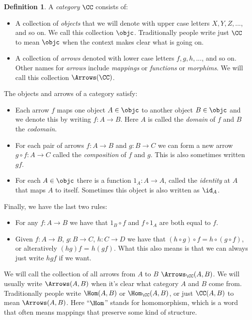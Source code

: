 \documentclass[12pt]{article}
\theoremstyle{definition}
\theoremstyle{definition}
\newtheorem{defn}{Definition}[]
\theoremstyle{definition}
\numberwithin{equation}{section}
\begin{document}
\begin{defn}
\label{category}
A {\it category} $\CC$ consists of:
% 
\begin{itemize}
\item 
A collection of {\it objects} that we will denote with upper case letters $X, Y, Z, ...$, and so on.  
We call this collection $\objc$. Traditionally people write just $\CC$ to mean $\objc$ when the context makes clear what is going on.
\item
A collection of {\it arrows} denoted with lower case letters $f, g, h, ...$, and so on. Other names for {\it arrows} include {\it mappings} or {\it functions} or {\it morphims}. We will call this collection $\Arrows(\CC)$.
\end{itemize}%
The objects and arrows of a category satisfy:
\begin{itemize}
\item
Each arrow $f$ maps one object $A \in \objc$ to another object $B \in \objc$ and we denote this by writing $f: A \to B$. Here $A$ is called the {\it domain} of $f$ and $B$ the {\it codomain}.

\item
For each pair of arrows $f:A \to B$ and $g : B \to C$ we can form a new arrow $g \circ f: A \to C$ called the {\it composition} of $f$ and $g$. This is also sometimes written $gf$.
\item
For each $A \in \objc$ there is a function $1_A: A \to A$, called the {\it identity} at $A$ that
maps $A$ to itself. Sometimes this object is also written as $\id_A$.
\end{itemize}
Finally, we have the last two rules:

\begin{itemize}
\item For any $f: A \to B$ we have that $1_B \circ f$ and $f \circ 1_A$ are both equal to $f$. 
\item Given $f: A \to B$, $g: B \to C$, $h: C\to D$ we have that $(h \circ g) \circ f = h \circ (g \circ f)$, or alteratively $(hg)f$ = $h(gf)$. What this also means is that we can always just write $hgf$ if we want.
\end{itemize}%
\end{defn}%
\noindent
We will call the collection of all arrows from $A$ to $B$ $\Arrows_{\CC}(A, B)$. 
We will usually write $\Arrows(A,B)$ when it's clear what category $A$ and $B$ come from. 
Traditionally people write $\Hom(A, B)$ or $\Hom_{\CC}(A,B)$, or just $\CC(A,B)$ to mean $\Arrows(A,B)$. Here ``$\Hom$'' stands for homomorphism, which is a word that often means mappings that preserve some kind of structure.
\end{document}
